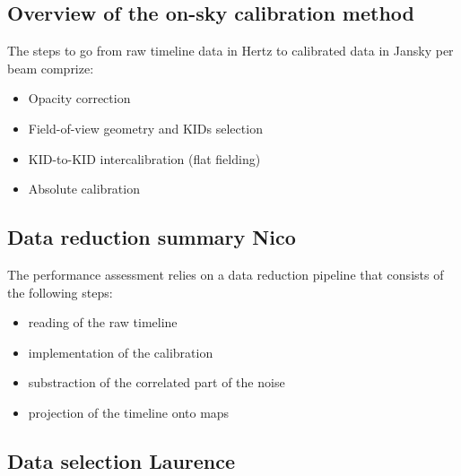 


\subsection{Overview of the on-sky calibration method}

The steps to go from raw timeline data in Hertz to calibrated data in Jansky per beam comprize:
\begin{itemize}
\item[] Opacity correction
\item[] Field-of-view geometry and KIDs selection
\item[] KID-to-KID intercalibration (flat fielding)
\item[] Absolute calibration  
\end{itemize}


\subsection{Data reduction summary {\color{blue} Nico}}

The performance assessment relies on a data reduction pipeline that consists of the following steps:
\begin{itemize}
\item[] reading of the raw timeline 
\item[] implementation of the calibration
\item[] substraction of the correlated part of the noise 
\item[] projection of the timeline onto maps
\end{itemize}


\subsection{Data selection {\color{blue} Laurence}}
\label{se:data_selection}


